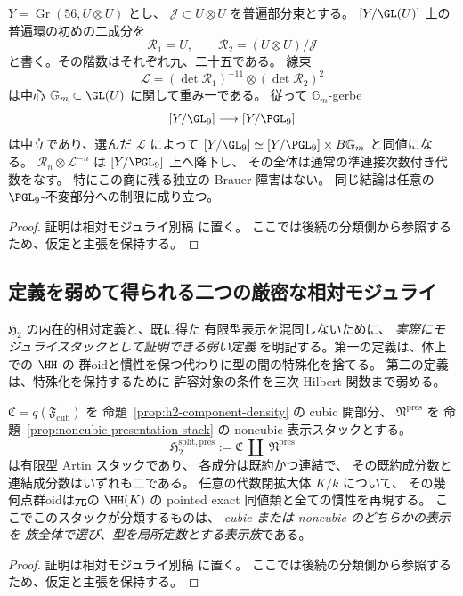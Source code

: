 \begin{proposition}
\label{prop:antiserre-gerbe-neutral}
$Y=\operatorname{Gr}(56,U\otimes U)$ とし、
$\mathcal J\subset U\otimes U$ を普遍部分束とする。
$[Y/\GL(U)]$ 上の普遍環の初めの二成分を
\[
 \mathcal R_1=U,\qquad
 \mathcal R_2=(U\otimes U)/\mathcal J
\]
と書く。その階数はそれぞれ九、二十五である。
線束
\[
 \mathcal L=(\det\mathcal R_1)^{-11}
                 \otimes(\det\mathcal R_2)^2
\]
は中心 $\mathbb G_m\subset\GL(U)$ に関して重み一である。
従って $\mathbb G_m$-gerbe
\[
 [Y/\GL_9]\longrightarrow[Y/\PGL_9]
\]
は中立であり、選んだ $\mathcal L$ によって
$[Y/\GL_9]\simeq[Y/\PGL_9]\times B\mathbb G_m$ と同値になる。
$\mathcal R_n\otimes\mathcal L^{-n}$ は $[Y/\PGL_9]$ 上へ降下し、
その全体は通常の準連接次数付き代数をなす。
特にこの商に残る独立の Brauer 障害はない。
同じ結論は任意の $\PGL_9$-不変部分への制限に成り立つ。
\end{proposition}

\begin{proof}
証明は相対モジュライ別稿 \cite[\texttt{foundation_stack} 節]{QuadricModuli2026} に置く。
ここでは後続の分類側から参照するため、仮定と主張を保持する。
\end{proof}


\subsection{定義を弱めて得られる二つの厳密な相対モジュライ}
\label{subsec:weak-moduli-stack-choices}

$\mathfrak H_2$ の内在的相対定義と、既に得た
有限型表示を混同しないために、
\emph{実際にモジュライスタックとして証明できる弱い定義}
を明記する。第一の定義は、体上での $\HH$ の
群oidと慣性を保つ代わりに型の間の特殊化を捨てる。
第二の定義は、特殊化を保持するために
許容対象の条件を三次 Hilbert 関数まで弱める。

\begin{proposition}[型を固定した表示族のモジュライ]
\label{prop:split-h2-presentation-moduli}
$\mathfrak C=q(\mathfrak F_{\mathrm{cub}})$ を
命題~\ref{prop:h2-component-density} の cubic 開部分、
$\mathfrak N^{\mathrm{pres}}$ を
命題~\ref{prop:noncubic-presentation-stack} の
noncubic 表示スタックとする。
\[
 \mathfrak H_2^{\mathrm{split,pres}}
 :=\mathfrak C\ \amalg\ \mathfrak N^{\mathrm{pres}}
 \tag{split-H2}\label{eq:split-h2-presentation-stack}
\]
は有限型 Artin スタックであり、
各成分は既約かつ連結で、
その既約成分数と連結成分数はいずれも二である。
任意の代数閉拡大体 $K/k$ について、
その幾何点群oidは元の $\HH(K)$ の
pointed exact 同値類と全ての慣性を再現する。
ここでこのスタックが分類するものは、
\emph{cubic または noncubic のどちらかの表示を
族全体で選び、型を局所定数とする表示族}である。
\end{proposition}
\begin{proof}
証明は相対モジュライ別稿 \cite[\texttt{foundation_stack} 節]{QuadricModuli2026} に置く。
ここでは後続の分類側から参照するため、仮定と主張を保持する。
\end{proof}

